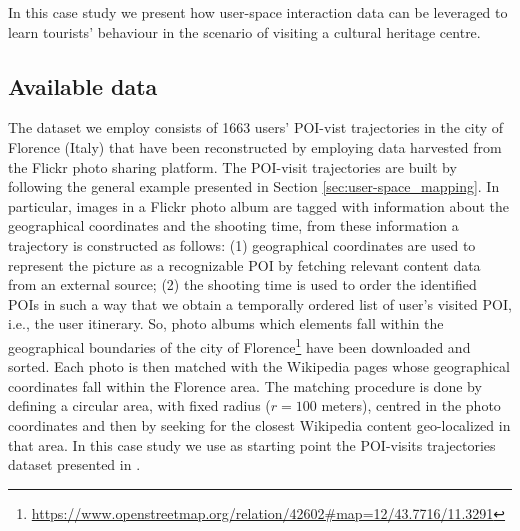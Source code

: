 In this case study we present how user-space interaction data can be leveraged to learn tourists' behaviour in the scenario of visiting a cultural heritage centre. %

\subsection{Available data}
The dataset we employ consists of 1663 users' POI-vist trajectories in the city of Florence (Italy) that have been reconstructed by employing data harvested from the Flickr photo sharing platform.
The POI-visit trajectories are built by following the general example presented in Section \ref{sec:user-space_mapping}.
In particular, images in a Flickr photo album are tagged with information about the geographical coordinates and the shooting time, from these information a trajectory 
is constructed as follows: (1) geographical coordinates are used to represent the picture as a recognizable POI by fetching relevant content data from an external source; (2) the shooting time is used to order the identified POIs in such a way that we obtain a temporally ordered list of user's visited POI, i.e., the user itinerary. 
So, photo albums which elements fall within the geographical boundaries of the city of Florence\footnote{\url{https://www.openstreetmap.org/relation/42602\#map=12/43.7716/11.3291}} have been downloaded and sorted.
Each photo is then matched with the Wikipedia pages whose geographical coordinates fall within the Florence area. The matching procedure is done by defining a circular area, with fixed radius ($r=100$ meters), centred in the photo coordinates and then by seeking  for the closest Wikipedia content geo-localized in that area.
In this case study we use as starting point the POI-visits trajectories dataset presented in \cite{flikr_tourism_RS:muntean:2015}.
